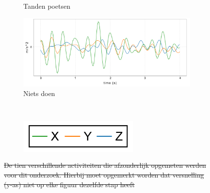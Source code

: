 \documentclass{article}
\providecommand{\DIFdel}[1]{{\protect\color{red}\sout{#1}}}                      %
\providecommand{\DIFaddend}{} %
\providecommand{\DIFdelFL}[1]{\DIFdel{#1}} %
\providecommand{\DIFaddbeginFL}{} %
\providecommand{\DIFaddendFL}{} %
\providecommand{\DIFdelbeginFL}{} %
\providecommand{\DIFdelendFL}{} %
\begin{document}
\begin{figure}[h!]
\begin{subfigure}[b]{.49\linewidth}
    \DIFaddendFL \caption{Tanden poetsen}\label{fig:1i}
  \end{subfigure}
  \begin{subfigure}[b]{.49\linewidth}
    \centering
    \DIFdelbeginFL %
\DIFdelendFL \DIFaddbeginFL \includegraphics[width=.80\textwidth]{figures/nietsdoen}
    \DIFaddendFL \caption{Niets doen}\label{fig:1j}
  \end{subfigure} \\
  \begin{subfigure}[b]{.49\linewidth}
    \centering
    \includegraphics[width=.25\textwidth]{figures/legend}
  \end{subfigure}

  \DIFdelbeginFL %
{%
\DIFdelFL{De tien verschillende activiteiten die afzonderlijk opgemeten werden voor dit onderzoek. Hierbij moet opgemerkt worden dat versnelling (y-as) niet op elke figuur dezelfde stap heeft}}
\DIFdelendFL \label{fig:8}
  \DIFdelbeginFL %
\DIFdelendFL \DIFaddbeginFL 

\end{figure}
\DIFaddend 
\end{document}
